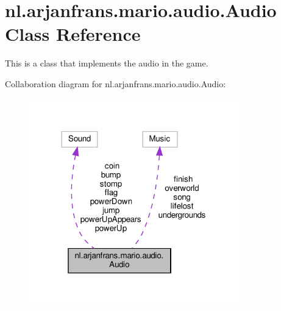 \hypertarget{classnl_1_1arjanfrans_1_1mario_1_1audio_1_1Audio}{}\section{nl.\+arjanfrans.\+mario.\+audio.\+Audio Class Reference}
\label{classnl_1_1arjanfrans_1_1mario_1_1audio_1_1Audio}


This is a class that implements the audio in the game.  




Collaboration diagram for nl.\+arjanfrans.\+mario.\+audio.\+Audio\+:\nopagebreak
\begin{figure}[H]
\begin{center}
\leavevmode
\includegraphics[width=258pt]{classnl_1_1arjanfrans_1_1mario_1_1audio_1_1Audio__coll__graph}
\end{center}
\end{figure}
